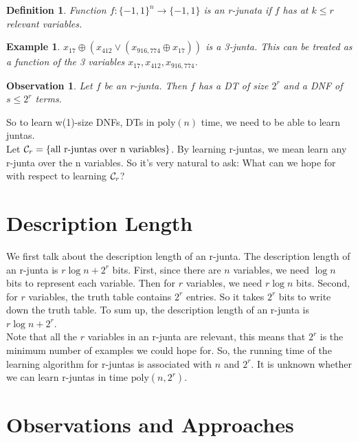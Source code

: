 \documentclass[12pt]{article}
\newtheorem{definition}[theorem]{Definition}
\newtheorem{observation}[theorem]{Observation}
\newtheorem{example}[theorem]{Example}
\newcommand{\calc}{{\cal C}}
\newcommand{\poly}{\mathrm{poly}}
\begin{document}
\begin{definition}
Function $f: \{ -1, 1 \}^n \rightarrow \{ -1,1 \}$ is an r-junata if
$f$ has at  $k \le r$ relevant variables.
\end{definition}

\begin{example}
$x_{17} \oplus (x_{412} \lor (x_{916,774} \oplus x_{17}))$ is a
3-junta. This can be treated as a function of the 3 variables $x_{17},
x_{412}, x_{916,774}$.
\end{example}

\begin{observation}
Let $f$ be an r-junta. Then $f$ has a DT of size $2^r$ and a DNF of $s
\le 2^r$ terms.
\end{observation}

So to learn w(1)-size DNFs, DTs in $\poly(n)$ time, we need to be able
to learn juntas. \\

Let $\calc_r = \{\text {all r-juntas over n variables} \}$. By
learning r-juntas, we mean learn any r-junta over the n variables. So
it's very natural to ask: What can we hope for with respect to
learning $\calc_r$? \\

\section{Description Length}

We first talk about the description length of an r-junta. The
description length of an r-junta is $r \log n + 2^r$ bits. First,
since there are $n$ variables, we need $\log n$ bits to represent each
variable. Then for $r$ variables, we need $r \log n$ bits. Second,
for $r$ variables, the truth table contains $2^r$ entries. So it takes
$2^r$ bits to write down the truth table.  To sum up, the description
length of an r-junta is $r \log n + 2^r$. \\

Note that all the $r$ variables in an r-junta are relevant, this means
that $2^r$ is the minimum number of examples we could hope for. So, the
running time of the learning algorithm for r-juntas is associated 
with $n$ and $2^r$. It is unknown whether we can learn r-juntas in
time $\poly (n, 2^r)$. \\

\section{Observations and Approaches}
\end{document}
